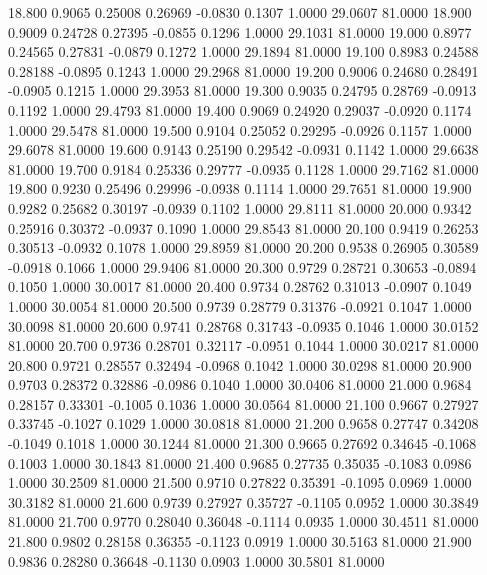   18.800   0.9065   0.25008   0.26969  -0.0830   0.1307   1.0000  29.0607  81.0000
  18.900   0.9009   0.24728   0.27395  -0.0855   0.1296   1.0000  29.1031  81.0000
  19.000   0.8977   0.24565   0.27831  -0.0879   0.1272   1.0000  29.1894  81.0000
  19.100   0.8983   0.24588   0.28188  -0.0895   0.1243   1.0000  29.2968  81.0000
  19.200   0.9006   0.24680   0.28491  -0.0905   0.1215   1.0000  29.3953  81.0000
  19.300   0.9035   0.24795   0.28769  -0.0913   0.1192   1.0000  29.4793  81.0000
  19.400   0.9069   0.24920   0.29037  -0.0920   0.1174   1.0000  29.5478  81.0000
  19.500   0.9104   0.25052   0.29295  -0.0926   0.1157   1.0000  29.6078  81.0000
  19.600   0.9143   0.25190   0.29542  -0.0931   0.1142   1.0000  29.6638  81.0000
  19.700   0.9184   0.25336   0.29777  -0.0935   0.1128   1.0000  29.7162  81.0000
  19.800   0.9230   0.25496   0.29996  -0.0938   0.1114   1.0000  29.7651  81.0000
  19.900   0.9282   0.25682   0.30197  -0.0939   0.1102   1.0000  29.8111  81.0000
  20.000   0.9342   0.25916   0.30372  -0.0937   0.1090   1.0000  29.8543  81.0000
  20.100   0.9419   0.26253   0.30513  -0.0932   0.1078   1.0000  29.8959  81.0000
  20.200   0.9538   0.26905   0.30589  -0.0918   0.1066   1.0000  29.9406  81.0000
  20.300   0.9729   0.28721   0.30653  -0.0894   0.1050   1.0000  30.0017  81.0000
  20.400   0.9734   0.28762   0.31013  -0.0907   0.1049   1.0000  30.0054  81.0000
  20.500   0.9739   0.28779   0.31376  -0.0921   0.1047   1.0000  30.0098  81.0000
  20.600   0.9741   0.28768   0.31743  -0.0935   0.1046   1.0000  30.0152  81.0000
  20.700   0.9736   0.28701   0.32117  -0.0951   0.1044   1.0000  30.0217  81.0000
  20.800   0.9721   0.28557   0.32494  -0.0968   0.1042   1.0000  30.0298  81.0000
  20.900   0.9703   0.28372   0.32886  -0.0986   0.1040   1.0000  30.0406  81.0000
  21.000   0.9684   0.28157   0.33301  -0.1005   0.1036   1.0000  30.0564  81.0000
  21.100   0.9667   0.27927   0.33745  -0.1027   0.1029   1.0000  30.0818  81.0000
  21.200   0.9658   0.27747   0.34208  -0.1049   0.1018   1.0000  30.1244  81.0000
  21.300   0.9665   0.27692   0.34645  -0.1068   0.1003   1.0000  30.1843  81.0000
  21.400   0.9685   0.27735   0.35035  -0.1083   0.0986   1.0000  30.2509  81.0000
  21.500   0.9710   0.27822   0.35391  -0.1095   0.0969   1.0000  30.3182  81.0000
  21.600   0.9739   0.27927   0.35727  -0.1105   0.0952   1.0000  30.3849  81.0000
  21.700   0.9770   0.28040   0.36048  -0.1114   0.0935   1.0000  30.4511  81.0000
  21.800   0.9802   0.28158   0.36355  -0.1123   0.0919   1.0000  30.5163  81.0000
  21.900   0.9836   0.28280   0.36648  -0.1130   0.0903   1.0000  30.5801  81.0000
